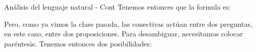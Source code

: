 \begin{frame}{Análisis del lenguaje natural - Cont}
  Tenemos entonces que la formula es:
  \jump
  \centerline{}
  \jump
  Pero, como ya vimos la clase pasada, las conectivas actúan entre dos preguntas,
  en este caso, entre dos proposiciones. Para desambiguar, necesitamos colocar
  paréntesis. Tenemos entonces dos posibilidades:
  \begin{columns}
    \begin{column}{0.5\textwidth}
      \centerline{}
    \end{column}
    \begin{column}{0.5\textwidth}
      \centerline{}
    \end{column}
  \end{columns}
\end{frame}


